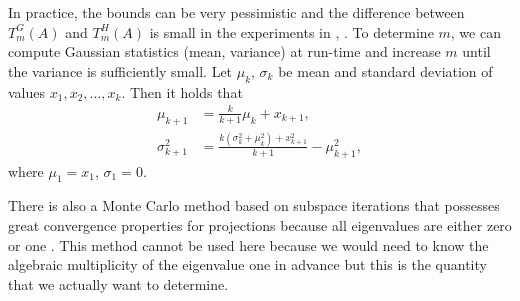 \documentclass[%
	paper=a4,
	fontsize=10pt,
	DIV11,BCOR10mm,
	numbers=noenddot,
	abstract=yes
]{scrartcl}
\theoremstyle{definition}
\begin{document}
In practice, the bounds can be very pessimistic and the difference between
$T_m^G(A)$ and $T_m^H(A)$ is small in the experiments in
\cite[§5]{Roosta-Khorasani2015}, \cite[§9]{Avron2011}. To determine $m$, we can
compute Gaussian statistics (mean, variance) at run-time and increase $m$ until
the variance is sufficiently small. Let $\mu_k$, $\sigma_k$ be mean and standard
deviation of values $x_1, x_2, \dotsc, x_k$. Then it holds that
\begin{align*}
	\mu_{k+1} &= \frac{k}{k+1} \mu_k + x_{k+1}, \\
	\sigma_{k+1}^2 &=
		\frac{k (\sigma_k^2 + \mu_k^2) + x_{k+1}^2}{k+1} - \mu_{k+1}^2,
\end{align*}
where $\mu_1 = x_1$, $\sigma_1 = 0$.

There is also a Monte Carlo method based on subspace iterations that possesses
great convergence properties for projections because all eigenvalues are either
zero or one \cite{Saibaba2016}. This method cannot be used here because we would
need to know the algebraic multiplicity of the eigenvalue one in advance but
this is the quantity that we actually want to determine.

\printbibliography
\end{document}
